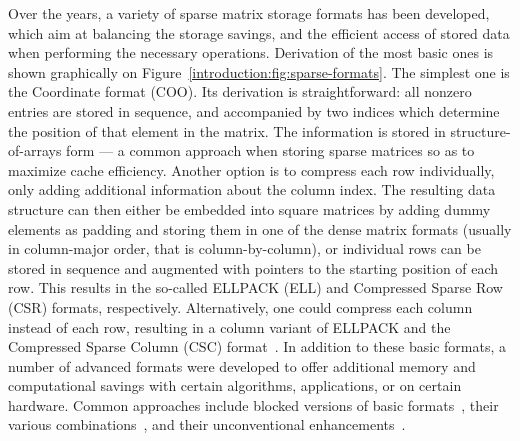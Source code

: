 Over the years, a variety of sparse matrix storage formats has been developed,
which aim at balancing the storage savings, and the efficient access of
stored data when performing the necessary operations. Derivation of the most
basic ones is shown graphically on Figure~\ref{introduction:fig:sparse-formats}.
The simplest one is the Coordinate format (COO). Its derivation is
straightforward: all nonzero entries are stored in sequence, and accompanied by
two indices which determine the position of that element in the matrix. The
information is stored in structure-of-arrays form --- a common approach when
storing sparse matrices so as to maximize cache efficiency. Another option is to
compress each row individually, only adding additional information about the
column index. The resulting data structure can then either be embedded into
square matrices by adding dummy elements as padding and storing them in one of
the dense matrix formats (usually in column-major order, that is
column-by-column), or individual rows can be stored in sequence and augmented
with pointers to the starting position of each row. This results in the
so-called ELLPACK (ELL) and Compressed Sparse Row (CSR) formats, respectively.
Alternatively, one could compress each column instead of each row, resulting in
a column variant of ELLPACK and the Compressed Sparse Column (CSC)
format~\cite{saad}. In addition to these basic formats, a number of advanced
formats were developed to offer additional memory and computational savings with
certain algorithms, applications, or on certain hardware. Common approaches
include blocked versions of basic formats~\cite{csb, bsr}, their various
combinations~\cite{sell-p,sell-c-sigma,bell-garland}, and their unconventional
enhancements~\cite{csr5, ecker}.

